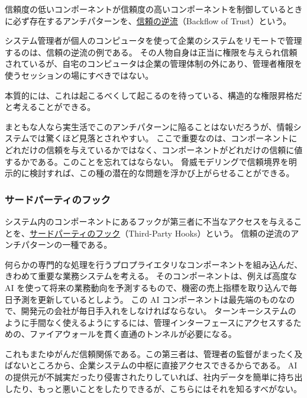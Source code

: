 \documentclass[uplatex]{jsarticle}
\def\label#1{}%
\begin{document}
\begin{dfn}[信頼の逆流]\label{dfn:ch4-backflow-of-trust}
信頼度の低いコンポーネントが信頼度の高いコンポーネントを制御しているときに必ず存在するアンチパターンを、\underline{信頼の逆流}（Backflow of Trust）という。
\end{dfn}

\begin{exa}[個人のコンピュータからのリモート管理]\label{exa:ch4-admin-home-computer}
システム管理者が個人のコンピュータを使って企業のシステムをリモートで管理するのは、信頼の逆流の例である。
その人物自身は正当に権限を与えられ信頼されているが、自宅のコンピュータは企業の管理体制の外にあり、管理者権限を使うセッションの場にすべきではない。
\end{exa}

本質的には、これは起こるべくして起こるのを待っている、構造的な権限昇格だと考えることができる。

まともな人なら実生活でこのアンチパターンに陥ることはないだろうが、情報システムでは驚くほど見落とされやすい。
ここで重要なのは、コンポーネントにどれだけの信頼を与えているかではなく、コンポーネントがどれだけの信頼に値するかである。このことを忘れてはならない。
脅威モデリングで信頼境界を明示的に検討すれば、この種の潜在的な問題を浮かび上がらせることができる。

\subsubsection{サードパーティのフック}

\begin{dfn}[サードパーティのフック]\label{dfn:ch4-third-party-hooks}
システム内のコンポーネントにあるフックが第三者に不当なアクセスを与えることを、\underline{サードパーティのフック}（Third-Party Hooks）という。
信頼の逆流のアンチパターンの一種である。
\end{dfn}

\begin{exa}[AI 予測コンポーネントのトンネル]\label{exa:ch4-ai-component}
何らかの専門的な処理を行うプロプライエタリなコンポーネントを組み込んだ、きわめて重要な業務システムを考える。
そのコンポーネントは、例えば高度な AI を使って将来の業務動向を予測するもので、機密の売上指標を取り込んで毎日予測を更新しているとしよう。
この AI コンポーネントは最先端のものなので、開発元の会社が毎日手入れをしなければならない。
ターンキーシステムのように手間なく使えるようにするには、管理インターフェースにアクセスするための、ファイアウォールを貫く直通のトンネルが必要になる。

これもまたゆがんだ信頼関係である。この第三者は、管理者の監督がまったく及ばないところから、企業システムの中枢に直接アクセスできるからである。
AI の提供元が不誠実だったり侵害されたりしていれば、社内データを簡単に持ち出したり、もっと悪いことをしたりできるが、こちらにはそれを知るすべがない。
\end{exa}
\end{document}
